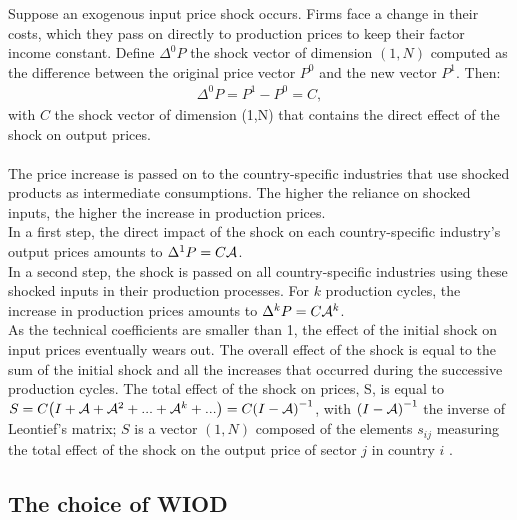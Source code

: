 \documentclass[11pt,a4paper]{article}
\begin{document}
Suppose an exogenous input price shock occurs. Firms face a change in their costs, which they pass on directly to production prices to keep their factor income constant.
Define ${{\Delta }^{0}}P$ the shock vector of dimension $(1, N)$ computed as the difference between the original price vector $P^0$ and the new vector $P^1$. Then:
\begin{eqnarray*}
\Delta ^{0}P=P^1-P^0=C, 
\end{eqnarray*}
with $C$ the shock vector of dimension (1,N) that contains the direct effect of the shock on output prices.\\
\\
The price increase is passed on to the country-specific industries that use shocked products as intermediate consumptions. The higher the reliance on shocked inputs, the higher the increase in production prices.\\
In a first step, the direct impact of the shock on each country-specific industry's output prices amounts to $\Delta^{1}P=C{\cal A}$.\\
In a second step, the shock is passed on all country-specific industries using these shocked inputs in their production processes. For $k$ production cycles, the increase in production prices amounts to $\Delta^k P=C{\cal A}^k$.\\
As the technical coefficients are smaller than 1, the effect of the initial shock on input prices eventually wears out.
The overall effect of the shock is equal to the sum of the initial shock and all the increases that occurred during the successive production cycles.
The total effect of the shock on prices, S, is equal to $S=C {\left( I+{\cal A}+{\cal A}^2+...+{\cal A}^k+...\right)} =C {\left( I-{\cal A} \right)}^{-1}$, with ${\left( I-{\cal A} \right)}^{-1}$ the inverse of Leontief's matrix; $S$ is a vector $(1, N)$ composed of the elements $s_{ij}$ measuring the total effect of the shock on the output price of sector $j$ in country $i$ .

\subsection{The choice of WIOD}
\label{subsec:data}
\end{document}
